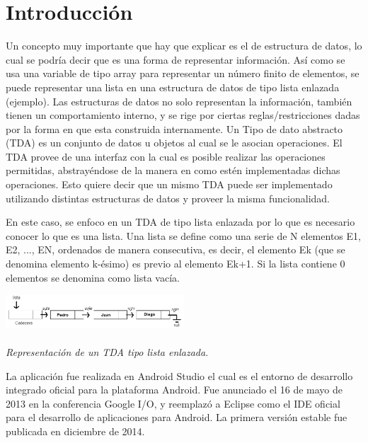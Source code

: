 \documentclass[conference]{IEEEtran}
\begin{document}
\section{Introducción}
%
Un concepto muy importante que hay que explicar es el de estructura de datos, lo cual se podría decir que es una forma de representar información. Así como se usa una variable de tipo array para representar un número finito de elementos, se puede representar una lista en una estructura de datos de tipo lista enlazada (ejemplo).\cite{1} Las estructuras de datos no solo representan la información, también tienen un comportamiento interno, y se rige por ciertas reglas/restricciones dadas por la forma en que esta construida internamente.\cite{2}
Un Tipo de dato abstracto (TDA) es un conjunto de datos u objetos al cual se le asocian operaciones. El TDA provee de una interfaz con la cual es posible realizar las operaciones permitidas, abstrayéndose de la manera en como estén implementadas dichas operaciones. Esto quiere decir que un mismo TDA puede ser implementado utilizando distintas estructuras de datos y proveer la misma funcionalidad.\cite{3}

En este caso, se enfoco en un TDA de tipo lista enlazada por lo que es necesario conocer lo que es una lista. Una lista se define como una serie de N elementos E1, E2, ..., EN, ordenados de manera consecutiva, es decir, el elemento Ek (que se denomina elemento k-ésimo) es previo al elemento Ek+1. Si la lista contiene 0 elementos se denomina como lista vacía.\cite{3}

\begin{center}
\includegraphics[width=0.5\textwidth]{lista}
\\\cite{4}
\\\textit{Representación de un TDA tipo lista enlazada}.
\end{center}

La aplicación fue realizada en Android Studio el cual es el entorno de desarrollo integrado oficial para la plataforma Android. Fue anunciado el 16 de mayo de 2013 en la conferencia Google I/O, y reemplazó a Eclipse como el IDE oficial para el desarrollo de aplicaciones para Android. La primera versión estable fue publicada en diciembre de 2014.\cite{5}
\end{document}
